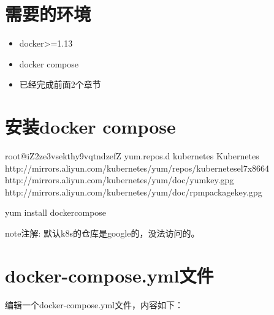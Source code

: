 \documentclass[letterpaper,10pt,english]{sphinxmanual}
\begin{document}
\section{需要的环境}
\label{\detokenize{_u5feb_u901f_u5165_u95e8/03-_u670d_u52a1:id2}}\begin{itemize}
\item {} 
docker\textgreater{}=1.13

\item {} 
docker compose

\item {} 
已经完成前面2个章节

\end{itemize}


\section{安装docker compose}
\label{\detokenize{_u5feb_u901f_u5165_u95e8/03-_u670d_u52a1:docker-compose}}
%
\begin{sphinxVerbatim}[commandchars=\\\{\}]
\PYG{o}{[}root@iZ2ze3vsekthy9vqtndzefZ yum.repos.d\PYG{o}{]}
\PYG{o}{[}kubernetes\PYG{o}{]}
Kubernetes
http://mirrors.aliyun.com/kubernetes/yum/repos/kubernetes\PYGZhy{}el7\PYGZhy{}x86\PYGZus{}64
http://mirrors.aliyun.com/kubernetes/yum/doc/yum\PYGZhy{}key.gpg
    http://mirrors.aliyun.com/kubernetes/yum/doc/rpm\PYGZhy{}package\PYGZhy{}key.gpg

yum install docker\PYGZhy{}compose
\end{sphinxVerbatim}

\begin{sphinxadmonition}{note}{注解:}
默认k8s的仓库是google的，没法访问的。
\end{sphinxadmonition}


\section{docker-compose.yml文件}
\label{\detokenize{_u5feb_u901f_u5165_u95e8/03-_u670d_u52a1:docker-compose-yml}}
编辑一个docker-compose.yml文件，内容如下：
\end{document}
